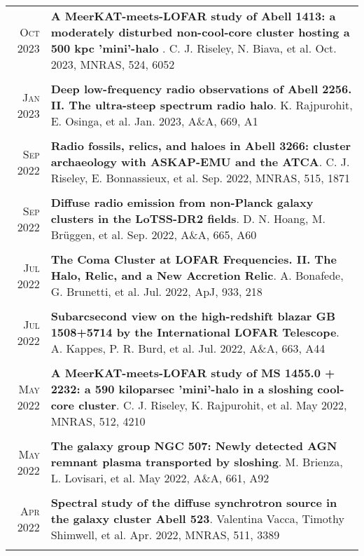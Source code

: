 \documentclass[11pt,a4paper,notitlepage]{article}
\begin{document}
\begin{tabular}{r|p{16.5cm}}

	\textsc{Oct 2023} & \textbf{A MeerKAT-meets-LOFAR study of Abell 1413: a moderately disturbed non-cool-core cluster hosting a 500 kpc 'mini'-halo }. C. J. Riseley, N. Biava, et al. Oct. 2023, MNRAS, 524, 6052 \\
\multicolumn{2}{c}{} \\

	\textsc{Jan 2023} & \textbf{Deep low-frequency radio observations of Abell 2256. II. The ultra-steep spectrum radio halo}. K. Rajpurohit, E. Osinga, et al. Jan. 2023, A\&A, 669, A1 \\
\multicolumn{2}{c}{} \\

\textsc{Sep 2022} & \textbf{Radio fossils, relics, and haloes in Abell 3266: cluster archaeology with ASKAP-EMU and the ATCA}. C. J. Riseley, E. Bonnassieux, et al. Sep. 2022, MNRAS, 515, 1871\\
\multicolumn{2}{c}{} \\

\textsc{Sep 2022} & \textbf{Diffuse radio emission from non-Planck galaxy clusters in the LoTSS-DR2 fields}. D. N. Hoang, M. Brüggen, et al. Sep. 2022, A\&A, 665, A60 \\
\multicolumn{2}{c}{} \\

\textsc{Jul 2022} & \textbf{The Coma Cluster at LOFAR Frequencies. II. The Halo, Relic, and a New Accretion Relic}. A. Bonafede, G. Brunetti, et al. Jul. 2022, ApJ, 933, 218 \\
\multicolumn{2}{c}{} \\

\textsc{Jul 2022} & \textbf{Subarcsecond view on the high-redshift blazar GB 1508+5714 by the International LOFAR Telescope}. A. Kappes, P. R. Burd, et al. Jul. 2022, A\&A, 663, A44 \\
\multicolumn{2}{c}{} \\

\textsc{May 2022} & \textbf{A MeerKAT-meets-LOFAR study of MS 1455.0 + 2232: a 590 kiloparsec 'mini'-halo in a sloshing cool-core cluster}. C. J. Riseley, K. Rajpurohit, et al. May 2022, MNRAS, 512, 4210 \\
\multicolumn{2}{c}{} \\

\textsc{May 2022} & \textbf{The galaxy group NGC 507: Newly detected AGN remnant plasma transported by sloshing}. M. Brienza, L. Lovisari, et al. May 2022, A\&A, 661, A92 \\
\multicolumn{2}{c}{} \\

\textsc{Apr 2022} & \textbf{Spectral study of the diffuse synchrotron source in the galaxy cluster Abell 523}. Valentina Vacca, Timothy Shimwell, et al. Apr. 2022, MNRAS, 511, 3389\\
\multicolumn{2}{c}{} \\

\end{tabular}
\end{document}
